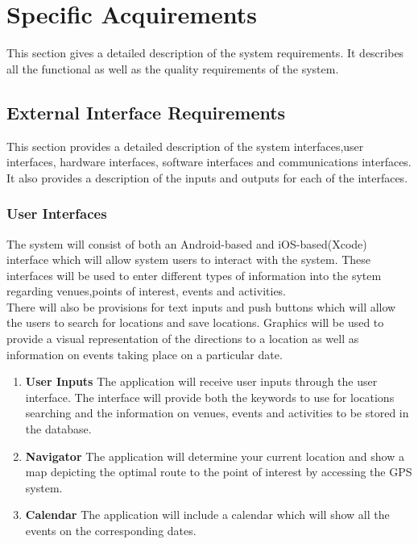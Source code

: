 \documentclass[a4paper,10pt]{article}
\begin{document}
	\section{Specific Acquirements}
This section gives a detailed description of the system requirements. It describes all the functional as well as the quality requirements of the system.

	\subsection{External Interface Requirements}
This section provides a detailed description of the system interfaces,user interfaces, hardware interfaces, software interfaces and communications interfaces. It also provides a description of the inputs and outputs for each of the interfaces.
                 \subsubsection{User Interfaces}
The system will consist of both an Android-based and iOS-based(Xcode) interface which will allow system users to interact with the system. These interfaces will be used to enter different types of information into the sytem regarding venues,points of interest, events and activities.\\ There will also be provisions for text inputs and push buttons which will allow the users to search for locations and save locations. Graphics will be used to provide a visual representation of the directions to a location as well as information on events taking place on a particular date.
             
\begin{enumerate}  
                     \item \textbf{User Inputs}
        The application will receive user inputs through the user interface. The interface will provide both the keywords to use for locations searching and the information on venues, events and activities to be stored in the database.
                      \item \textbf{Navigator}
                     The application will determine your current location  and show a map depicting the optimal route to the point of interest by accessing the GPS system.

                      \item \textbf{Calendar}
                  The application will include a calendar which will show all the events on the corresponding dates.


\end{enumerate}
\end{document}
